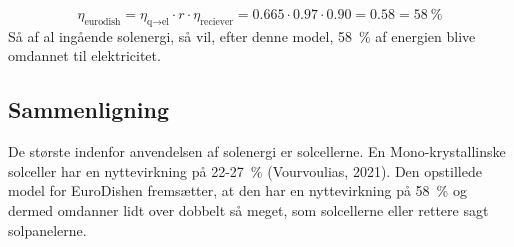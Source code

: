 \documentclass[SRC.tex]{subfiles}
\begin{document}
	\begin{equation}
		\eta_{\text{eurodish}} = \eta_{\text{q}\rightarrow\text{el}} \cdot r \cdot \eta_{\text{reciever}}  = 0.665 \cdot 0.97 \cdot 0.90 = 0.58 = \SI{58}{\percent}
	\end{equation} 
	Så af al ingående solenergi, så vil, efter denne model, \SI{58}{\percent} af energien blive omdannet til elektricitet. 
	\subsection{Sammenligning}
	De største indenfor anvendelsen af solenergi er solcellerne. En Mono-krystallinske solceller har en nyttevirkning på 22-\SI{27}{\percent} (Vourvoulias, 2021).
	Den opstillede model for EuroDishen fremsætter, at den har en nyttevirkning på \SI{58}{\percent} 
	og dermed omdanner lidt over dobbelt så meget, som solcellerne eller rettere sagt solpanelerne. 
\end{document}
